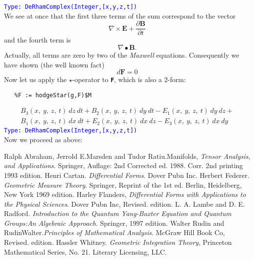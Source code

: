 \documentclass[12pt,a4paper]{article}
\newcommand{\spadbold}[1]{{\tt\bf #1}}
\newcommand{\type}[1]{\textcolor{blue}{\tt\tiny #1}}
\begin{document}
\type{Type: DeRhamComplex(Integer,[x,y,z,t])}
\\
We see at once that the first three terms of the sum correspond to the
vector
\begin{displaymath}
   \nabla\times\mathbf{E}+\frac{\partial\mathbf{B}}{\partial t}
\end{displaymath}
and the fourth term is
\begin{displaymath}
 \nabla\bullet\mathbf{B}.
\end{displaymath}
Actually, all terms are zero by two of the {\it Maxwell} equations. 
Consequently we have shown (the well known fact)
\begin{displaymath}
   d\mathbf{F} = 0
\end{displaymath}
Now let us apply the $\star$-operator to \spadbold{F}, which is also a 
$2$-form:
\begin{lstlisting}
   %F := hodgeStar(g,F)$M
\end{lstlisting}
\begin{eqnarray*}
    {{{B _ {3}}\left({x, \: y, \: z, \: t}\right)}
    \  dz \  dt} + {{{B _ {2}} \left({x, \: y, \: z, \: t}
    \right)}\  dy \  dt} -{{{E _ {1}}\left({x, \: y, \: z, \: t}
    \right)}\  dy \  dz}+ \\ 
    {{{B _ {1}}\left({x, \: y, \: z, \: t}\right)}
    \  dx \  dt} + {{{E _ {2}}\left({x, \: y, \: z, \: t}
    \right)}\  dx \  dz}- {{{E _ {3}}\left({x, \: y, \: z, \: t}
    \right)}\  dx \  dy}
\end{eqnarray*}
\type{Type: DeRhamComplex(Integer,[x,y,z,t])}
\\
Now we proceed as above:


%
% 
\begin{thebibliography}{1}
%
 Ralph Abraham, Jerrold E.Marsden and Tudor Ratiu.Manifolds, 
       {\em Tensor Analysis, and Applications}. Springer,
       Auflage: 2nd Corrected ed. 1988. Corr. 2nd printing 1993 edition.
%       
 Henri Cartan. {\em Differential Forms}. Dover Pubn Inc.
%
 Herbert Federer. {\em Geometric Measure Theory}. Springer, 
       Reprint of the 1st ed. Berlin, Heidelberg, New York 1969 edition.
%
 Harley Flanders, {\em Differential Forms with Applications to 
       the Physical Sciences}. Dover Pubn Inc, Revised. edition.
%
 L. A. Lambe and D. E. Radford. {\em Introduction to the 
       Quantum Yang-Baxter Equation and Quantum Groups:An Algebraic Approach}.
       Springer, 1997 edition.
%
 Walter Rudin and RudinWalter.{\em Principles of Mathematical
       Analysis}. McGraw Hill Book Co, Revised. edition.
%
 Hassler Whitney. {\em Geometric Integration Theory}, 
       Princeton Mathematical Series, No. 21. Literary Licensing, LLC.
\end{thebibliography}
%
\end{document}
